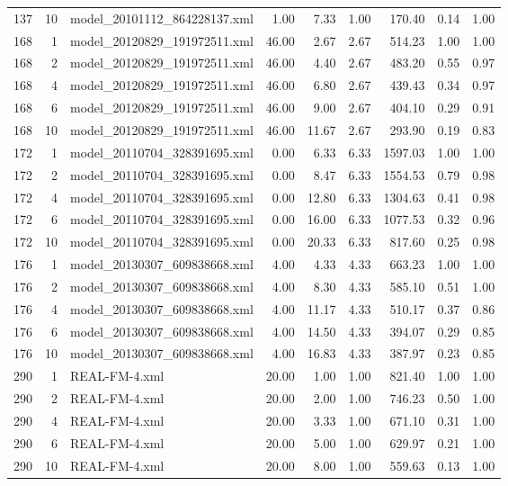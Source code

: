 \begin{table}[ht]
\begin{tabular}{rrlrrrrrr}
  137 &  10 & model\_20101112\_864228137.xml & 1.00 & 7.33 & 1.00 & 170.40 & 0.14 & 1.00 \\ 
  168 &   1 & model\_20120829\_191972511.xml & 46.00 & 2.67 & 2.67 & 514.23 & 1.00 & 1.00 \\ 
  168 &   2 & model\_20120829\_191972511.xml & 46.00 & 4.40 & 2.67 & 483.20 & 0.55 & 0.97 \\ 
  168 &   4 & model\_20120829\_191972511.xml & 46.00 & 6.80 & 2.67 & 439.43 & 0.34 & 0.97 \\ 
  168 &   6 & model\_20120829\_191972511.xml & 46.00 & 9.00 & 2.67 & 404.10 & 0.29 & 0.91 \\ 
  168 &  10 & model\_20120829\_191972511.xml & 46.00 & 11.67 & 2.67 & 293.90 & 0.19 & 0.83 \\ 
  172 &   1 & model\_20110704\_328391695.xml & 0.00 & 6.33 & 6.33 & 1597.03 & 1.00 & 1.00 \\ 
  172 &   2 & model\_20110704\_328391695.xml & 0.00 & 8.47 & 6.33 & 1554.53 & 0.79 & 0.98 \\ 
  172 &   4 & model\_20110704\_328391695.xml & 0.00 & 12.80 & 6.33 & 1304.63 & 0.41 & 0.98 \\ 
  172 &   6 & model\_20110704\_328391695.xml & 0.00 & 16.00 & 6.33 & 1077.53 & 0.32 & 0.96 \\ 
  172 &  10 & model\_20110704\_328391695.xml & 0.00 & 20.33 & 6.33 & 817.60 & 0.25 & 0.98 \\ 
  176 &   1 & model\_20130307\_609838668.xml & 4.00 & 4.33 & 4.33 & 663.23 & 1.00 & 1.00 \\ 
  176 &   2 & model\_20130307\_609838668.xml & 4.00 & 8.30 & 4.33 & 585.10 & 0.51 & 1.00 \\ 
  176 &   4 & model\_20130307\_609838668.xml & 4.00 & 11.17 & 4.33 & 510.17 & 0.37 & 0.86 \\ 
  176 &   6 & model\_20130307\_609838668.xml & 4.00 & 14.50 & 4.33 & 394.07 & 0.29 & 0.85 \\ 
  176 &  10 & model\_20130307\_609838668.xml & 4.00 & 16.83 & 4.33 & 387.97 & 0.23 & 0.85 \\ 
  290 &   1 & REAL-FM-4.xml & 20.00 & 1.00 & 1.00 & 821.40 & 1.00 & 1.00 \\ 
  290 &   2 & REAL-FM-4.xml & 20.00 & 2.00 & 1.00 & 746.23 & 0.50 & 1.00 \\ 
  290 &   4 & REAL-FM-4.xml & 20.00 & 3.33 & 1.00 & 671.10 & 0.31 & 1.00 \\ 
  290 &   6 & REAL-FM-4.xml & 20.00 & 5.00 & 1.00 & 629.97 & 0.21 & 1.00 \\ 
  290 &  10 & REAL-FM-4.xml & 20.00 & 8.00 & 1.00 & 559.63 & 0.13 & 1.00 \\ 
   \hline
\end{tabular}
\end{table}
